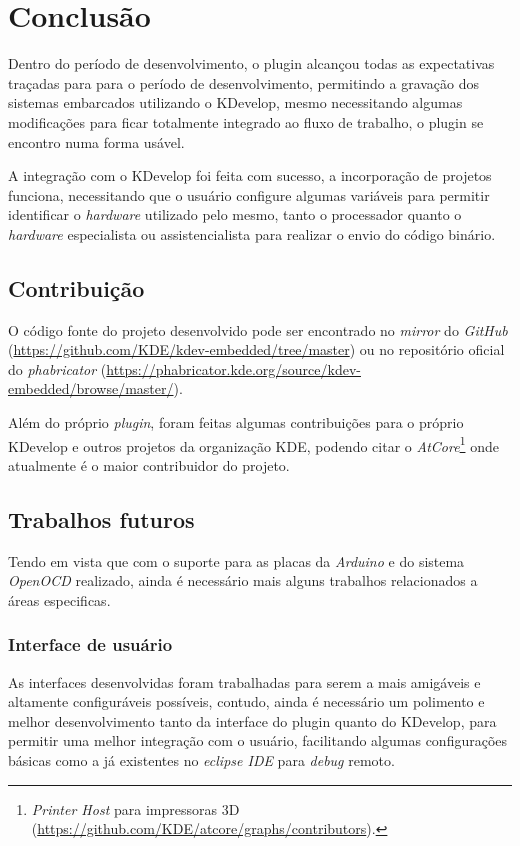 \chapter{Conclusão}
Dentro do período de desenvolvimento, o plugin alcançou todas as expectativas traçadas para para o período de desenvolvimento,
permitindo a gravação dos sistemas embarcados utilizando o KDevelop, mesmo necessitando algumas modificações para ficar
totalmente integrado ao fluxo de trabalho, o plugin se encontro numa forma usável.

A integração com o KDevelop foi feita com sucesso, a incorporação de projetos funciona, necessitando que o usuário configure algumas variáveis para permitir identificar o \textit{hardware} utilizado pelo mesmo, tanto o processador quanto o \textit{hardware} especialista ou assistencialista para realizar o envio do código binário.

\section{Contribuição}

O código fonte do projeto desenvolvido pode ser encontrado no \textit{mirror} do \textit{GitHub} (\url{https://github.com/KDE/kdev-embedded/tree/master}) ou no repositório oficial do \textit{phabricator} (\url{https://phabricator.kde.org/source/kdev-embedded/browse/master/}).

Além do próprio \textit{plugin}, foram feitas algumas contribuições para o próprio KDevelop e outros projetos da organização KDE, podendo citar o \textit{AtCore}\footnote{\textit{Printer Host} para impressoras 3D (\url{https://github.com/KDE/atcore/graphs/contributors}).} onde atualmente é o maior contribuidor do projeto.

\section{Trabalhos futuros}

Tendo em vista que com o suporte para as placas da \textit{Arduino} e do sistema \textit{OpenOCD} realizado, ainda é necessário mais alguns trabalhos relacionados a áreas especificas.

\subsection{Interface de usuário}
As interfaces desenvolvidas foram trabalhadas para serem a mais amigáveis e altamente configuráveis possíveis, contudo, ainda é necessário um polimento e melhor desenvolvimento tanto da interface do plugin quanto do KDevelop, para permitir uma melhor integração com o usuário, facilitando algumas configurações básicas como a já existentes no \textit{eclipse IDE} para \textit{debug} remoto.

